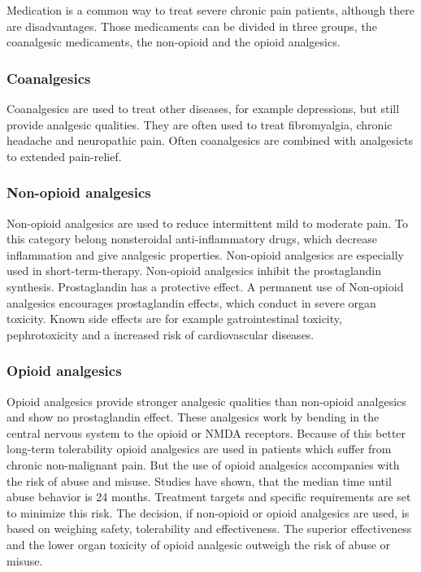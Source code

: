 Medication is a common way to treat severe chronic pain patients, although there are disadvantages. Those medicaments can be divided in three groups, the coanalgesic medicaments, the non-opioid and the opioid analgesics. \cite{marcus2009}

\subsubsection{Coanalgesics}

Coanalgesics are used to treat other diseases, for example depressions, but still provide analgesic qualities. They are often used to treat fibromyalgia, chronic headache and neuropathic pain. Often coanalgesics are combined with analgesicts to extended pain-relief. \cite{marcus2009}

\subsubsection{Non-opioid analgesics}

Non-opioid analgesics are used to reduce intermittent mild to moderate pain. To this category belong nonsteroidal anti-inflammatory drugs, which decrease inflammation and give analgesic properties. Non-opioid analgesics are especially used in short-term-therapy. Non-opioid analgesics inhibit the prostaglandin synthesis. Prostaglandin has a protective effect. A permanent use of Non-opioid analgesics encourages prostaglandin effects, which conduct in severe organ toxicity. Known side effects are for example gatrointestinal toxicity, pephrotoxicity and a increased risk of cardiovascular diseases. \cite{marcus2009,stein2007}

\subsubsection{Opioid analgesics}

Opioid analgesics provide stronger analgesic qualities than non-opioid analgesics and show no prostaglandin effect. These analgesics work by bending in the central nervous system to the opioid or NMDA receptors.  Because of this better long-term tolerability opioid analgesics are used in patients which suffer from chronic non-malignant pain. But the use of opioid analgesics accompanies with the risk of abuse and misuse. Studies have shown, that the median time until abuse behavior is 24 months. Treatment targets and specific requirements are set to minimize this risk. \cite{marcus2009,stein2007}
The decision, if non-opioid or opioid analgesics are used, is based on weighing safety, tolerability and effectiveness. The superior effectiveness and the lower organ toxicity of opioid analgesic outweigh the risk of abuse or misuse. \cite{marcus2009}